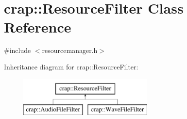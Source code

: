 \hypertarget{classcrap_1_1_resource_filter}{\section{crap\+:\+:Resource\+Filter Class Reference}
\label{classcrap_1_1_resource_filter}
}


{\ttfamily \#include $<$resourcemanager.\+h$>$}

Inheritance diagram for crap\+:\+:Resource\+Filter\+:\begin{figure}[H]
\begin{center}
\leavevmode
\includegraphics[height=2.000000cm]{classcrap_1_1_resource_filter}
\end{center}
\end{figure}
